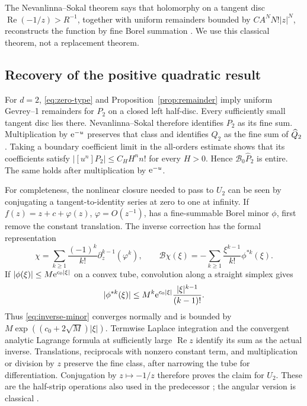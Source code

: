 \documentclass[11pt,a4paper]{article}
\numberwithin{equation}{section}
\theoremstyle{definition}\newtheorem{definition}[theorem]{Definition}
\theoremstyle{remark}\newtheorem{remark}[theorem]{Remark}
\theoremstyle{definition}
\newcommand{\Rea}{\operatorname{Re}}\newcommand{\Ima}{\operatorname{Im}}
\newcommand{\B}{\mathcal B_0}\newcommand{\Hh}{\mathcal H}
\begin{document}
The Nevanlinna--Sokal theorem says that holomorphy on a tangent disc
$\Rea(-1/z)>R^{-1}$, together with uniform remainders bounded by
$CA^NN!|z|^N$, reconstructs the function by fine Borel summation
\cite{sokal}. We use this classical theorem, not a replacement theorem.

\subsection{Recovery of the positive quadratic result}
For $d=2$, \eqref{eq:zero-type} and Proposition~\ref{prop:remainder} imply
uniform Gevrey--1 remainders for $P_2$ on a closed left half-disc. Every
sufficiently small tangent disc lies there. Nevanlinna--Sokal therefore
identifies $P_2$ as its fine sum. Multiplication by $\mathrm e^{-u}$ preserves that
class and identifies $Q_2$ as the fine sum of $\widehat Q_2$.
Taking a boundary coefficient limit in the all-orders estimate shows that
its coefficients satisfy $|[u^n]P_2|\le C_HH^nn!$ for every $H>0$.
Hence $\B\widehat P_2$ is entire. The same holds after multiplication by
$\mathrm e^{-u}$.

For completeness, the nonlinear closure needed to pass to $U_2$ can be
seen by conjugating a tangent-to-identity series at zero to one at infinity.
If $f(z)=z+c+\varphi(z)$, $\varphi=O(z^{-1})$, has a fine-summable Borel
minor $\phi$, first remove the constant translation. The inverse correction
has the formal representation
\begin{equation}
 \chi=\sum_{k\ge1}\frac{(-1)^k}{k!}
                   \partial_z^{k-1}(\varphi^k),\qquad
 \mathscr B\chi(\xi)=-\sum_{k\ge1}\frac{\xi^{k-1}}{k!}\phi^{*k}(\xi).
 \label{eq:inverse-minor}
\end{equation}
If $|\phi(\xi)|\le M\mathrm e^{c_0|\xi|}$ on a convex tube, convolution along a
straight simplex gives
\[
 |\phi^{*k}(\xi)|\le M^k\mathrm e^{c_0|\xi|}
                      \frac{|\xi|^{k-1}}{(k-1)!}.
\]
Thus \eqref{eq:inverse-minor} converges normally and is bounded by
$M\exp((c_0+2\sqrt M)|\xi|)$. Termwise Laplace integration and the
convergent analytic Lagrange formula at sufficiently large $\Rea z$
identify its sum as the actual inverse. Translations, reciprocals with
nonzero constant term, and multiplication or division by $z$ preserve the
fine class, after narrowing the tube for differentiation. Conjugation by
$z\mapsto-1/z$ therefore proves the claim for $U_2$. These are the
half-strip operations also used in the predecessor \cite{repo-fine}; the
angular version is classical \cite{sauzin}.
\end{document}
